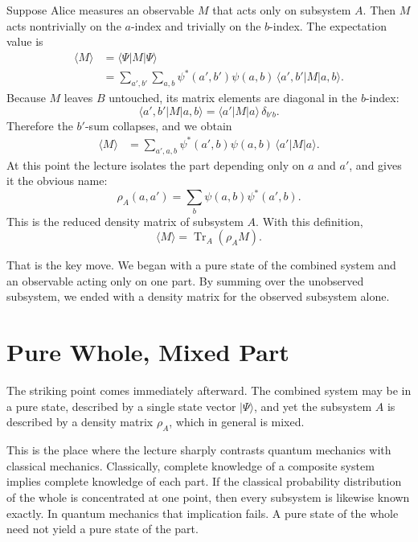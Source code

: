 Suppose Alice measures an observable \(M\) that acts only on subsystem \(A\). Then \(M\) acts nontrivially on the \(a\)-index and trivially on the \(b\)-index. The expectation value is
\begin{align}
\langle M\rangle
&= \langle \Psi|M|\Psi\rangle \\
&= \sum_{a',b'} \sum_{a,b}
\psi^*(a',b')\psi(a,b)\,
\langle a',b'|M|a,b\rangle.
\end{align}
Because \(M\) leaves \(B\) untouched, its matrix elements are diagonal in the \(b\)-index:
\begin{equation}
\langle a',b'|M|a,b\rangle
=
\langle a'|M|a\rangle\,\delta_{b'b}.
\end{equation}
Therefore the \(b'\)-sum collapses, and we obtain
\begin{align}
\langle M\rangle
&=
\sum_{a',a,b}
\psi^*(a',b)\psi(a,b)\,
\langle a'|M|a\rangle.
\end{align}
At this point the lecture isolates the part depending only on \(a\) and \(a'\), and gives it the obvious name:
\begin{equation}
\rho_A(a,a')
=
\sum_b \psi(a,b)\psi^*(a',b).
\end{equation}
This is the reduced density matrix of subsystem \(A\). With this definition,
\begin{equation}
\langle M\rangle = \operatorname{Tr}_A(\rho_A M).
\end{equation}

That is the key move. We began with a pure state of the combined system and an observable acting only on one part. By summing over the unobserved subsystem, we ended with a density matrix for the observed subsystem alone.

\section{Pure Whole, Mixed Part}

The striking point comes immediately afterward. The combined system may be in a pure state, described by a single state vector \(|\Psi\rangle\), and yet the subsystem \(A\) is described by a density matrix \(\rho_A\), which in general is mixed.

This is the place where the lecture sharply contrasts quantum mechanics with classical mechanics. Classically, complete knowledge of a composite system implies complete knowledge of each part. If the classical probability distribution of the whole is concentrated at one point, then every subsystem is likewise known exactly. In quantum mechanics that implication fails. A pure state of the whole need not yield a pure state of the part.

